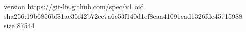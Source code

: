 version https://git-lfs.github.com/spec/v1
oid sha256:19b6856bf81ac35f42b72ce7a6c53f140d1ef8eaa41091cad1326fde45715988
size 87544
